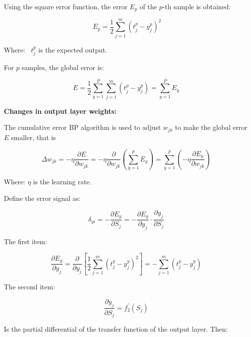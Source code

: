 \documentclass[12pt]{article}  %
\begin{document}
Using the square error function, the error $E_{p}$ of the $p$-th sample is obtained:

\begin{equation}\label{eq:heat6}
\ E_{p}=\frac{1}{2} \sum_{j=1}^{m}\left(t_{j}^{p}-y_{j}^{p}\right)^{2}\end{equation}

Where: \ $t_{j}^{p}$ is the expected output.

For $p$ samples, the global error is:


\begin{equation}\label{eq:heat7}E=\frac{1}{2} \sum_{y=1}^{P} \sum_{j=1}^{m}\left(t_{j}^{p}-y_{j}^{p}\right)=\sum_{y=1}^{P} E_{y}\end{equation}

\textbf{ Changes in output layer weights:}

The cumulative error BP algorithm is used to adjust $w_{j k}$ to make the global error $E$ smaller, that is


\begin{equation}\label{eq:heat8}\Delta w_{j k}=-\eta \frac{\partial E}{\partial w_{j k}}=-\eta \frac{\partial}{\partial w_{j k}}\left(\sum_{y=1}^{p} E_{y}\right)=\sum_{y=1}^{p}\left(-\eta \frac{\partial E_{y}}{\partial w_{j k}}\right)\end{equation}

Where: $\eta$ is the learning rate.

Define the error signal as:

\begin{equation}\label{eq:heat8}\delta_{y i}=-\frac{\partial E_{y}}{\partial S_{j}}=-\frac{\partial E_{y}}{\partial y_{j}} \cdot \frac{\partial y_{j}}{\partial S_{j}}\end{equation}

The first item:

\begin{equation}\label{eq:heat9}\frac{\partial E_{y}}{\partial y_{j}}=\frac{\partial}{\partial y_{j}}\left[\frac{1}{2} \sum_{j=1}^{m}\left(t_{j}^{y}-y_{j}^{y}\right)^{2}\right]=-\sum_{j=1}^{m}\left(t_{j}^{y}-y_{j}^{y}\right)\end{equation}

The second item:

\begin{equation}\label{eq:heat10}\frac{\partial y_{j}}{\partial S_{j}}=f_{2}^{\prime}\left(S_{j}\right)\end{equation}

Is the partial differential of the transfer function of the output layer.
Then:
\end{document}

